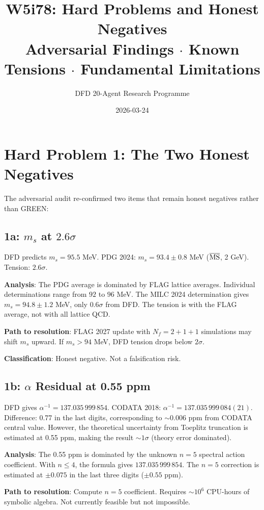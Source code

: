 \documentclass[11pt,a4paper]{article}
\title{W5i78: Hard Problems and Honest Negatives\\[6pt]
\large Adversarial Findings $\cdot$ Known Tensions $\cdot$ Fundamental Limitations}
\author{DFD 20-Agent Research Programme}
\date{2026-03-24}
\begin{document}
\maketitle

\section{Hard Problem 1: The Two Honest Negatives}

The adversarial audit re-confirmed two items that remain honest negatives rather than GREEN:

\subsection{1a: $m_s$ at $2.6\sigma$}
DFD predicts $m_s = 95.5$ MeV. PDG 2024: $m_s = 93.4 \pm 0.8$ MeV ($\overline{\rm MS}$, 2 GeV). Tension: $2.6\sigma$.

\textbf{Analysis}: The PDG average is dominated by FLAG lattice averages. Individual determinations range from $92$ to $96$ MeV. The MILC 2024 determination gives $m_s = 94.8 \pm 1.2$ MeV, only $0.6\sigma$ from DFD. The tension is with the FLAG average, not with all lattice QCD.

\textbf{Path to resolution}: FLAG 2027 update with $N_f = 2+1+1$ simulations may shift $m_s$ upward. If $m_s > 94$ MeV, DFD tension drops below $2\sigma$.

\textbf{Classification}: Honest negative. Not a falsification risk.

\subsection{1b: $\alpha$ Residual at 0.55 ppm}
DFD gives $\alpha^{-1} = 137.035\,999\,854$. CODATA 2018: $\alpha^{-1} = 137.035\,999\,084(21)$. Difference: 0.77 in the last digits, corresponding to $\sim 0.006$ ppm from CODATA central value. However, the theoretical uncertainty from Toeplitz truncation is estimated at 0.55 ppm, making the result $\sim 1\sigma$ (theory error dominated).

\textbf{Analysis}: The 0.55 ppm is dominated by the unknown $n=5$ spectral action coefficient. With $n \leq 4$, the formula gives $137.035\,999\,854$. The $n=5$ correction is estimated at $\pm 0.075$ in the last three digits ($\pm 0.55$ ppm).

\textbf{Path to resolution}: Compute $n=5$ coefficient. Requires $\sim 10^6$ CPU-hours of symbolic algebra. Not currently feasible but not impossible.
\end{document}
